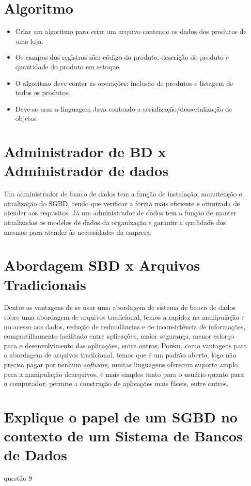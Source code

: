 \documentclass[12pt]{article}
\begin{document}
\section{Algoritmo}
\begin{itemize}
\item Criar um algoritmo para criar um arquivo contendo os dados dos produtos de uma loja.
\item Os campos dos registros são: código do produto, descrição do produto e quantidade do produto em estoque.
\item O algoritmo deve conter as operações: inclusão de produtos e listagem de todos os produtos.
\item Deve-se usar a linguagem Java contendo a serialização/desserialização de objetos
\end{itemize}

\section{Administrador de BD x Administrador de dados}
Um administrador de banco de dados tem a função de instalação, manutenção e atualização do SGBD, tendo que verificar a forma mais eficiente e otimizada de atender aos requisitos.
Já um administrador de dados tem a função de manter atualizados os modelos de dados da organização e garantir a qualidade dos mesmos para atender às necessidades da empresa.

\section{Abordagem SBD x Arquivos Tradicionais}
Dentre as vantagens de se usar uma abordagem de sistema de banco de dados sobre uma abordagem de arquivos tradicional, temos a rapidez na manipulação e no acesso aos dados, redução de redundâncias e de inconsistência de informações, compartilhamento facilitado entre aplicações, maior segurança, menor esforço para o desenvolvimento das aplicações, entre outros.
Porém, como vantagens para a abordagem de arquivos tradicional, temos que é um padrão aberto, logo não precisa pagar por nenhum \textit{software}, muitas linguagens oferecem suporte amplo para a manipulação dearquivos, é mais simples tanto para o usuário quanto para o computador, permite a construção de aplicações mais fáceis, entre outros.

\section{Explique o papel de um SGBD no contexto de um Sistema de Bancos de Dados}
questão 9
\end{document}
